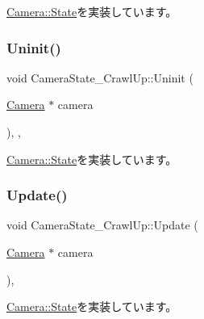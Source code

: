 \mbox{\hyperlink{class_camera_1_1_state_aa1b81471ab15e64b3117ffe7de9560ff}{Camera\+::\+State}}を実装しています。

\mbox{\label{class_camera_state___crawl_up_ac9822b09d8e5fa9e1def7ac8a1e9c893}} 
\subsubsection{\texorpdfstring{Uninit()}{Uninit()}}
{\footnotesize\ttfamily void Camera\+State\+\_\+\+Crawl\+Up\+::\+Uninit (\begin{DoxyParamCaption}\item[{\mbox{\hyperlink{class_camera}{Camera}} $\ast$}]{camera }\end{DoxyParamCaption})\hspace{0.3cm}{\ttfamily [inline]}, {\ttfamily [override]}, {\ttfamily [virtual]}}



\mbox{\hyperlink{class_camera_1_1_state_a68ebfc3f15cae24b342cb5dae57497cf}{Camera\+::\+State}}を実装しています。

\mbox{\label{class_camera_state___crawl_up_aaebd2634f1677b7c00e6761ed91e1264}} 
\subsubsection{\texorpdfstring{Update()}{Update()}}
{\footnotesize\ttfamily void Camera\+State\+\_\+\+Crawl\+Up\+::\+Update (\begin{DoxyParamCaption}\item[{\mbox{\hyperlink{class_camera}{Camera}} $\ast$}]{camera }\end{DoxyParamCaption})\hspace{0.3cm}{\ttfamily [override]}, {\ttfamily [virtual]}}



\mbox{\hyperlink{class_camera_1_1_state_a2d41e0cb783666bae6c6ea167fcc7874}{Camera\+::\+State}}を実装しています。



